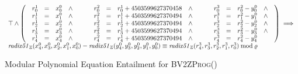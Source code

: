 \begin{figure*}
  \centering
  $
  \begin{array}{l}
  \top \wedge
  \left(
  \begin{array}{lclcl}
    \begin{array}{rclc}
      {r}^1_0 & = & {x}^0_0 & \wedge \\
      {r}^1_1 & = & {x}^0_1 & \wedge \\
      {r}^1_2 & = & {x}^0_2 & \wedge \\
      {r}^1_3 & = & {x}^0_3 & \wedge \\
      {r}^1_4 & = & {x}^0_4 & \wedge \\
    \end{array}
    &\hspace{.01\textwidth}&
    \begin{array}{rclc}
      {r}^2_0 & = & {r}^1_0 + {4503599627370458} & \wedge \\
      {r}^2_1 & = & {r}^1_1 + {4503599627370494} & \wedge \\
      {r}^2_2 & = & {r}^1_2 + {4503599627370494} & \wedge \\
      {r}^2_3 & = & {r}^1_3 + {4503599627370494} & \wedge \\
      {r}^2_4 & = & {r}^1_4 + {4503599627370494} & \wedge\\
    \end{array}
    &\hspace{.01\textwidth}&
    \begin{array}{rclc}
      {r}^3_0 & = & {r}^2_0 - {y}^0_0 & \wedge \\
      {r}^3_1 & = & {r}^2_1 - {y}^0_1 & \wedge \\
      {r}^3_2 & = & {r}^2_2 - {y}^0_2 & \wedge \\
      {r}^3_3 & = & {r}^2_3 - {y}^0_3 & \wedge \\
      {r}^3_4 & = & {r}^2_4 - {y}^0_4
    \end{array}
  \end{array}
  \right) \implies \\
    \mathit{radix51}_\bbfZ({x}^0_4, {x}^0_3, {x}^0_2, {x}^0_1, {x}^0_0) -
    \mathit{radix51}_\bbfZ({y}^0_4, {y}^0_3, {y}^0_2, {y}^0_1, {y}^0_0)
    \equiv
    \mathit{radix51}_\bbfZ({r}^3_4, {r}^3_3, {r}^3_2, {r}^3_1, {r}^3_0)
    \mod \myprime
  \end{array}
  $
  \caption{Modular Polynomial Equation Entailment for \textsc{BV2ZProg}()}
  \label{figure:translation:subtraction-polynomial}
\end{figure*}

